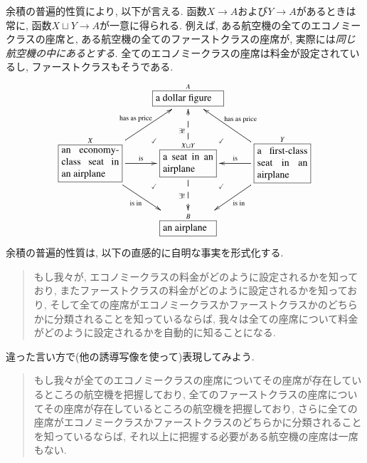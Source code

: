 \begin{example}
余積の普遍的性質により, 以下が言える. 函数$X\to A$および$Y\to A$があるときは常に, 函数$X\sqcup Y\to A$が一意に得られる. 例えば, ある航空機の全てのエコノミークラスの座席と, ある航空機の全てのファーストクラスの座席が, 実際には\emph{同じ航空機の中にあるとする}. 全てのエコノミークラスの座席は料金が設定されているし, ファーストクラスもそうである.
\begin{align}
\xymatrix{
&\obox{A}{.9in}{a dollar figure}&\\
\obox{X}{.8in}{an economy-class seat in an airplane}\LA{ru}{has as price}\LA{r}{is}\LAL{dr}{is in}&\obox{X\sqcup Y}{.7in}{a seat in an airplane}\ar@{-->}[d]_{\exists!}\ar@{-->}[u]^{\exists!}\ar@{}[ur]|(.35){\checkmark}\ar@{}[dl]|(.35){\checkmark}\ar@{}[dr]|(.35){\checkmark}\ar@{}[ul]|(.35){\checkmark}&\obox{Y}{.7in}{a first-class seat in an airplane}\LAL{l}{is}\LAL{lu}{has as price}\LA{dl}{is in}\\
&\obox{B}{.7in}{an airplane}&
}
\end{align}
余積の普遍的性質は, 以下の直感的に自明な事実を形式化する.
\begin{quote}
もし我々が, エコノミークラスの料金がどのように設定されるかを知っており, またファーストクラスの料金がどのように設定されるかを知っており, そして全ての座席がエコノミークラスかファーストクラスかのどちらかに分類されることを知っているならば, 我々は全ての座席について料金がどのように設定されるかを自動的に知ることになる.
\end{quote}
違った言い方で(他の誘導写像を使って)表現してみよう.
\begin{quote}
もし我々が全てのエコノミークラスの座席についてその座席が存在しているところの航空機を把握しており, 全てのファーストクラスの座席についてその座席が存在しているところの航空機を把握しており, さらに全ての座席がエコノミークラスかファーストクラスのどちらかに分類されることを知っているならば, それ以上に把握する必要がある航空機の座席は一席もない.
\end{quote}

\end{example}


